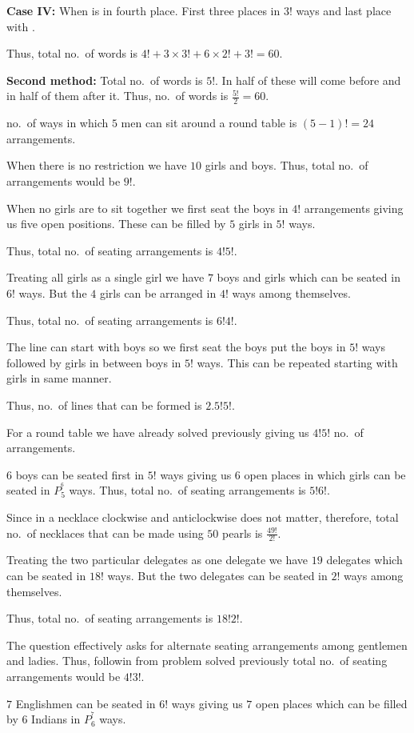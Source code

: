   {\bf Case IV:} When  is in fourth place. First three places in $3!$ ways and last place with
  .

  Thus, total no.\ of words is $4! + 3\times3! + 6\times2! + 3! = 60$.

  {\bf Second method:} Total no.\ of words is $5!$. In half of these  will come before  and
  in half of them after it. Thus, no.\ of words is $\frac{5!}{2} = 60$.
\item no.\ of ways in which $5$ men can sit around a round table is $(5 - 1)! = 24$ arrangements.
\item When there is no restriction we have $10$ girls and boys. Thus, total no.\ of arrangements would be
  $9!$.

  When no girls are to sit together we first seat the boys in $4!$ arrangements giving us five open
  positions. These can be filled by $5$ girls in $5!$ ways.

  Thus, total no.\ of seating arrangements is $4!5!$.
\item Treating all girls as a single girl we have $7$ boys and girls which can be seated in $6!$ ways. But
  the $4$ girls can be arranged in $4!$ ways among themselves.

  Thus, total no.\ of seating arrangements is $6!4!$.
\item The line can start with boys so we first seat the boys put the boys in $5!$ ways followed by girls in
  between boys in $5!$ ways. This can be repeated starting with girls in same manner.

  Thus, no.\ of lines that can be formed is $2.5!5!$.

  For a round table we have already solved previously giving us $4!5!$ no.\ of arrangements.
\item $6$ boys can be seated first in $5!$ ways giving us $6$ open places in which girls can be seated in
  $P_5^^6$ ways. Thus, total no.\ of seating arrangements is $5!6!$.
\item Since in a necklace clockwise and anticlockwise does not matter, therefore, total no.\ of necklaces
  that can be made using $50$ pearls is $\frac{49!}{2!}$.
\item Treating the two particular delegates as one delegate we have $19$ delegates which can be seated in
  $18!$ ways. But the two delegates can be seated in $2!$ ways among themselves.

  Thus, total no.\ of seating arrangements is $18!2!$.
\item The question effectively asks for alternate seating arrangements among gentlemen and ladies. Thus,
  followin from problem solved previously total no.\ of seating arrangements would be $4!3!$.
\item $7$ Englishmen can be seated in $6!$ ways giving us $7$ open places which can be filled by $6$ Indians
  in $P_6^^7$ ways.

